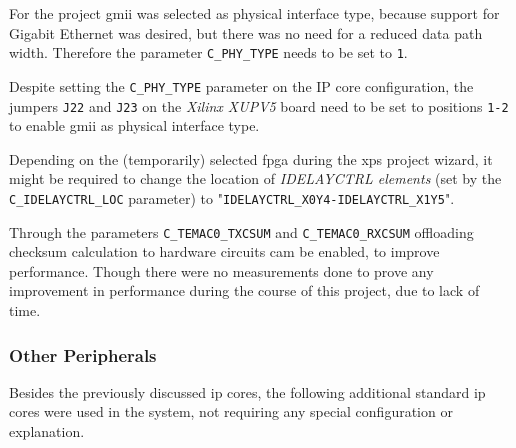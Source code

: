 For the project \gls{gmii} was selected as physical interface type, because support for Gigabit Ethernet was desired, but there was no need for a reduced data path width. Therefore the parameter \texttt{C\_PHY\_TYPE} needs to be set to \texttt{1}.

Despite setting the \texttt{C\_PHY\_TYPE} parameter on the IP core configuration, the jumpers \texttt{J22} and \texttt{J23} on the \textit{Xilinx XUPV5} board need to be set to positions \texttt{1-2} to enable \gls{gmii} as physical interface type.

Depending on the (temporarily) selected \gls{fpga} during the \gls{xps} project wizard, it might be required to change the location of \textit{IDELAYCTRL elements} (set by the \texttt{C\_IDELAYCTRL\_LOC} parameter) to "\texttt{IDELAYCTRL\_X0Y4-IDELAYCTRL\_X1Y5}".

Through the parameters \texttt{C\_TEMAC0\_TXCSUM} and \texttt{C\_TEMAC0\_RXCSUM} offloading checksum calculation to hardware circuits cam be enabled, to improve performance. Though there were no measurements done to prove any improvement in performance during the course of this project, due to lack of time.

\subsubsection{Other Peripherals}

Besides the previously discussed \gls{ip} cores, the following additional standard \gls{ip} cores were used in the system, not requiring any special configuration or explanation.

